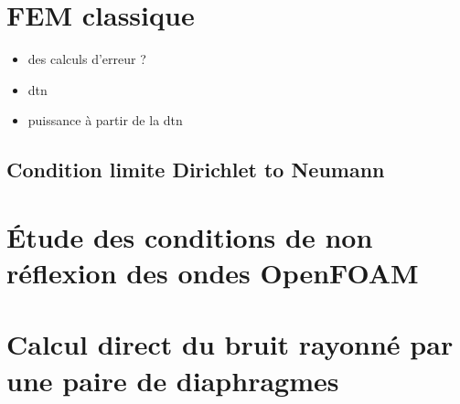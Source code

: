
    
\chapter{FEM classique }
    \label{section:appendixFEM}
    \begin{itemize}
        \item des calculs d'erreur ? 
        \item \gls{dtn} 
        \item puissance à partir de la \gls{dtn}
    \end{itemize}
    \section{Condition limite Dirichlet to Neumann}
        


\chapter{Étude des conditions de non réflexion des ondes OpenFOAM}
    \label{section:appendixBCCheck}
    

\chapter{Calcul direct du bruit rayonné par une paire de diaphragmes}
    \label{section:appendixDD}


